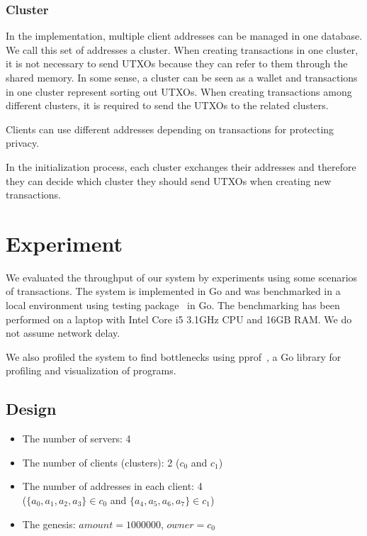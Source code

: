 \documentclass[a4paper, oneside]{discothesis}
\begin{document}
\subsection{Cluster}
In the implementation, multiple client addresses can be managed in one database.
We call this set of addresses a cluster.
When creating transactions in one cluster, it is not necessary to send UTXOs
because they can refer to them through the shared memory.
In some sense, a cluster can be seen as a wallet and transactions in one cluster
represent sorting out UTXOs.
When creating transactions among different clusters, it is required to send the UTXOs to the related clusters.

Clients can use different addresses depending on transactions for protecting privacy.

In the initialization process, each cluster exchanges their addresses and therefore they can decide which cluster they should send UTXOs when creating new transactions.


\chapter{Experiment}
We evaluated the throughput of our system by experiments using some scenarios of transactions.
The system is implemented in Go and was benchmarked in a local environment
using testing package~\cite{testing, flags} in Go.
The benchmarking has been performed on a laptop with Intel Core i5 3.1GHz CPU and 16GB RAM.
We do not assume network delay.

We also profiled the system to find bottlenecks using pprof~\cite{pprof, profiling},
a Go library for profiling and visualization of programs.

\section{Design}
\begin{itemize}
    \item The number of servers: 4
    \item The number of clients (clusters): 2 ($c_0$ and $c_1$)
    \item The number of addresses in each client: 4\\
        ($\{a_0, a_1, a_2, a_3\} \in c_0$ and $\{a_4, a_5, a_6, a_7\} \in c_1$)
    \item The genesis: $amount = 1000000$, $owner = c_0$
\end{itemize}
\end{document}
